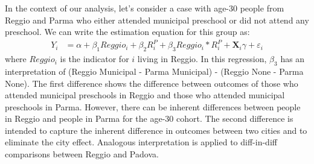 In the context of our analysis, let's consider a case with age-30 people from Reggio and Parma who either attended municipal preschool or did not attend any preschool. We can write the estimation equation for this group as:
\begin{eqnarray}  \label{eq:specific2}
Y_i & = \alpha + \beta_1 Reggio_i + \beta_2 R_i^P + \beta_3 Reggio_i * R_i^P + \bm{X}_i\gamma + \varepsilon_i 
\end{eqnarray}
where $Reggio_i$ is the indicator for $i$ living in Reggio. In this regression, $\beta_3$ has an interpretation of (Reggio Municipal - Parma Municipal) - (Reggio None - Parma None). The first difference shows the difference between outcomes of those who attended municipal preschools in Reggio and those who attended municipal preschools in Parma. However, there can be inherent differences between people in Reggio and people in Parma for the age-30 cohort. The second difference is intended to capture the inherent difference in outcomes between two cities and to eliminate the city effect. Analogous interpretation is applied to diff-in-diff comparisons between Reggio and Padova. 